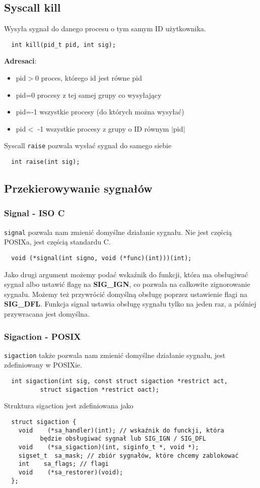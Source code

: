 \subsection{Syscall kill}
\label{kill}
Wysyła sygnał do danego procesu o tym samym ID użytkownika.
\begin{verbatim}
  int kill(pid_t pid, int sig);
\end{verbatim}
\textbf{Adresaci}:
\begin{itemize}
	\item pid$>$0 proces, którego id jest równe pid
	\item pid=0 procesy z tej samej grupy co wysyłający
	\item pid=-1 wszystkie procesy (do których można wysyłać)
	\item pid$<$ -1 wszystkie procesy z grupy o ID równym $|$pid$|$
\end{itemize}
Syscall \texttt{raise} pozwala wysłać sygnał do samego siebie
\begin{verbatim}
  int raise(int sig);
\end{verbatim}
\subsection{Przekierowywanie sygnałów}
\subsubsection{Signal - ISO C}
\texttt{signal} pozwala nam zmienić domyślne działanie sygnału. Nie jest częścią POSIXa, jest częścią standardu C.
\begin{verbatim}
  void (*signal(int signo, void (*func)(int)))(int);
\end{verbatim}
Jako drugi argument możemy podać wskaźnik do funkcji, która ma obsługiwać sygnał albo ustawić flagę na \textbf{SIG\_IGN}, co pozwala na całkowite zignorowanie sygnału. Możemy też przywrócić domyślną obsługę poprzez ustawienie flagi na \textbf{SIG\_DFL}. Funkcja signal ustawia obsługę sygnału tylko na jeden raz, a później przywracana jest domyślna.
\subsubsection{Sigaction - POSIX}
\texttt{sigaction} także pozwala nam zmienić domyślne działanie sygnału, jest zdefiniowany w POSIXie.
\begin{verbatim}
  int sigaction(int sig, const struct sigaction *restrict act,
          struct sigaction *restrict oact);
\end{verbatim}
Struktura sigaction jest zdefiniowana jako
\begin{verbatim}
  struct sigaction {
    void    (*sa_handler)(int); // wskaźnik do funckji, która
          będzie obsługiwać sygnał lub SIG_IGN / SIG_DFL
    void    (*sa_sigaction)(int, siginfo_t *, void *); 
    sigset_t  sa_mask; // zbiór sygnałów, które chcemy zablokować
    int    sa_flags; // flagi
    void    (*sa_restorer)(void);
  };
\end{verbatim}

